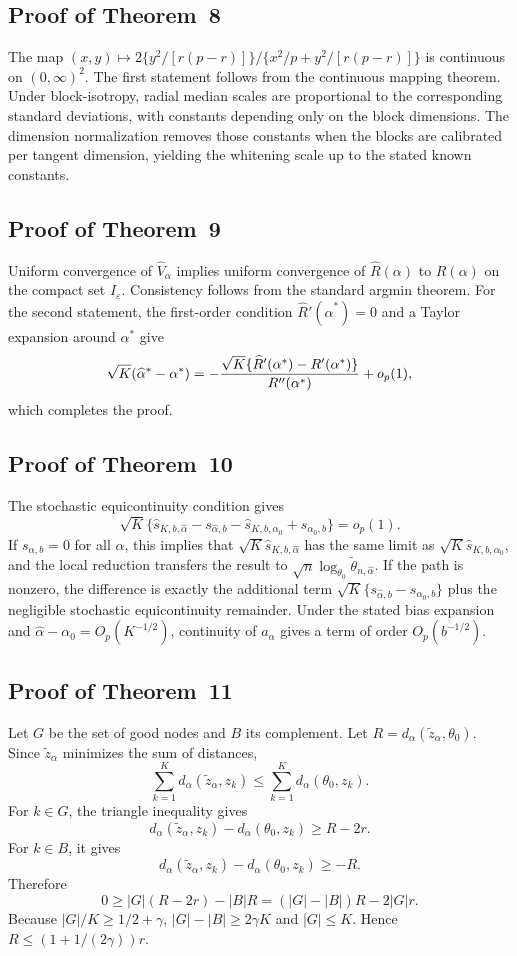 \documentclass[11pt]{article}
\newcommand{\eps}{\varepsilon}
\begin{document}
\subsection{Proof of Theorem~8}
The map \((x,y)\mapsto 2\{y^2/[r(p-r)]\}/\{x^2/p+y^2/[r(p-r)]\}\) is continuous on \((0,\infty)^2\).  The first statement follows from the continuous mapping theorem.  Under block-isotropy, radial median scales are proportional to the corresponding standard deviations, with constants depending only on the block dimensions.  The dimension normalization removes those constants when the blocks are calibrated per tangent dimension, yielding the whitening scale up to the stated known constants.

\subsection{Proof of Theorem~9}
Uniform convergence of \(\widehat V_\alpha\) implies uniform convergence of \(\widehat R(\alpha)\) to \(R(\alpha)\) on the compact set \(I_\eps\).  Consistency follows from the standard argmin theorem.  For the second statement, the first-order condition \(\widehat R'(\widehat\alpha^*)=0\) and a Taylor expansion around \(\alpha^*\) give
\[
    \sqrt K(\widehat\alpha^*-\alpha^*)
    =-{\sqrt K\{\widehat R'(\alpha^*)-R'(\alpha^*)\}\over R''(\alpha^*)}+o_p(1),
\]
which completes the proof.

\subsection{Proof of Theorem~10}
The stochastic equicontinuity condition gives
\[
    \sqrt K\{\widehat s_{K,b,\widehat\alpha}-s_{\widehat\alpha,b}
    -\widehat s_{K,b,\alpha_0}+s_{\alpha_0,b}\}=o_p(1).
\]
If \(s_{\alpha,b}=0\) for all \(\alpha\), this implies that \(\sqrt K\widehat s_{K,b,\widehat\alpha}\) has the same limit as \(\sqrt K\widehat s_{K,b,\alpha_0}\), and the local reduction transfers the result to \(\sqrt n\log_{\theta_0}\widetilde\theta_{n,\widehat\alpha}\).  If the path is nonzero, the difference is exactly the additional term \(\sqrt K\{s_{\widehat\alpha,b}-s_{\alpha_0,b}\}\) plus the negligible stochastic equicontinuity remainder.  Under the stated bias expansion and \(\widehat\alpha-\alpha_0=O_p(K^{-1/2})\), continuity of \(a_\alpha\) gives a term of order \(O_p(b^{-1/2})\).


\subsection{Proof of Theorem~11}
Let \(G\) be the set of good nodes and \(B\) its complement.  Let \(R=d_\alpha(\widetilde z_\alpha,\theta_0)\).  Since \(\widetilde z_\alpha\) minimizes the sum of distances,
\[
    \sum_{k=1}^K d_\alpha(\widetilde z_\alpha,z_k)
    \le \sum_{k=1}^K d_\alpha(\theta_0,z_k).
\]
For \(k\in G\), the triangle inequality gives
\[
    d_\alpha(\widetilde z_\alpha,z_k)-d_\alpha(\theta_0,z_k)
    \ge R-2r.
\]
For \(k\in B\), it gives
\[
    d_\alpha(\widetilde z_\alpha,z_k)-d_\alpha(\theta_0,z_k)
    \ge -R.
\]
Therefore
\[
    0\ge |G|(R-2r)-|B|R=(|G|-|B|)R-2|G|r.
\]
Because \(|G|/K\ge1/2+\gamma\), \(|G|-|B|\ge2\gamma K\) and \(|G|\le K\).  Hence \(R\le (1+1/(2\gamma))r\).
\end{document}
